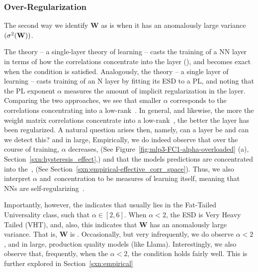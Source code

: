 \subsubsection{Over-Regularization}
\label{sxn:underfitting}


The second way we identify $\mathbf{W}$ as \ATypical is when it has an anomalously large variance $(\sigma^2({\mathbf{W}}))$.

The \SETOL theory -- a single-layer theory of learning -- casts the training 
of a NN layer in terms of how the correlations concentrate into the layer  \EffectiveCorrelationSpace (\ECS),
and becomes exact when the \TRACELOG condition is satisfied.
Analogously, the \HTSR theory -- a single layer \Phenomenology of learning -- casts training
of an N layer by fitting its ESD to a PL, and noting that the PL exponent $\alpha$ measures
the amount of implicit regularization in the layer.
Comparing the two approaches, we see that smaller $\alpha$ corresponds to the correlations
concentrating into a low-rank~\ECS.  In general, and likewise, the more the weight matrix
correlations concentrate  into a low-rank~\ECS, the better the layer has been regularized.
A natural question arises then, namely, can a layer be \emph{\OverRegularized} and
can we detect this?
and in large,
Empirically, we do indeed observe that over the course of training, $\alpha$ decreases, (See Figure~\ref{fig:mlp3-FC1-alpha-overloaded} 
(a), Section~\ref{sxn:hysteresis_effect},) and that the models predictions are concentrated into the~\ECS, 
(See Section~\ref{sxn:empirical-effective_corr_space}). Thus, we also interpret $\alpha$ and~\ECS concentration to be 
measures of learning itself, meaning that NNs are self-regularizing~\cite{MM18_TR_JMLRversion}.

Importantly, however, the \HTSR \Phenomenology indicates that \ALPHA usually lies in the Fat-Tailed Universality class,
such that $\alpha\in [2,6]$.  When $\alpha <2$, the ESD is Very Heavy Tailed (VHT), and, also,
this indicates that $\mathbf{W}$ has an anomalously large variance.  That is,  $\mathbf{W}$ is  \ATypical.
Occasionally, but very infrequently, we do observe $\alpha<2$, and in large, production quality models
(like Llama\cite{LLAMA}).
Interestingly, we also observe that, frequently, when the \HTSR $\alpha<2$, the \SETOL \TRACELOG
condition holds fairly well.  This is further explored in Section~\ref{sxn:empirical}

